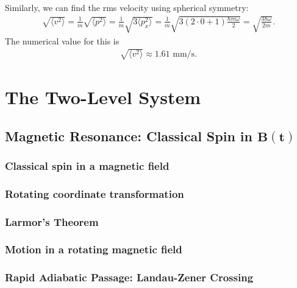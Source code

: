 \documentclass{book}
\theoremstyle{definition}
\newcommand{\f}[2]{\frac{#1}{#2}}
\begin{document}
Similarly, we can find the rms velocity using spherical symmetry:
\begin{align*}
\sqrt{\langle v^2 \rangle} = \f{1}{m}\sqrt{\langle p^2 \rangle} = \f{1}{m}\sqrt{3\langle p_x^2 \rangle} = \f{1}{m}\sqrt{3(2\cdot 0 + 1) \f{\hbar m \omega}{2}} = \sqrt{\f{3\hbar \omega}{2m}}.
\end{align*}
The numerical value for this is
\begin{align*}
\sqrt{\langle v^2 \rangle} \approx 1.61 \text{ mm/s}.
\end{align*}












\chapter{The Two-Level System}








\section{Magnetic Resonance: Classical Spin in $\mathbf{{B}(t)}$}




\subsection{Classical spin in a magnetic field}

\subsection{Rotating coordinate transformation}


\subsection{Larmor's Theorem}


\subsection{Motion in a rotating magnetic field}

\subsection{Rapid Adiabatic Passage: Landau-Zener Crossing}
\end{document}
